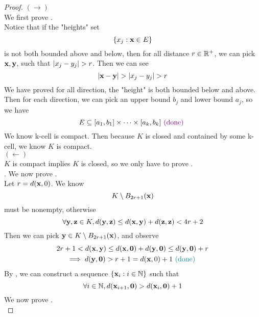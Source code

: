 \documentclass{report}
\begin{document}
\begin{proof}
$(\longrightarrow)$\\

We first prove .\\

Notice that if the "heights" set 
\begin{equation}
\{ x_j:\textbf{x}\in E \}
\end{equation}
is not both bounded above and below, then for all distance $r\in\mathbb{R}^+$, we can pick $\textbf{x},\textbf{y}$, such that $\abso{x_j-y_j}>r$. Then we can see 
\begin{equation}
\abso{\vecta{x}-\vecta{y}}>\abso{x_j-y_j}>r
\end{equation}
We have proved for all direction, the "height" is both bounded below and above.\\

Then for each direction, we can pick an upper bound $b_j$ and lower bound $a_j$, so we have
\begin{equation}
E\subseteq [a_1,b_1]\times \cdots \times [a_k,b_k]\textcolor{violet}{\text{ (done) }}
\end{equation}
We know k-cell is compact. Then because $K$ is closed and contained by some k-cell, we know $K$ is compact.\\

$(\longleftarrow)$\\

$K$ is compact implies $K$ is closed, so we only have to prove .\\

. We now prove  .\\

Let $r=d(\textbf{x},0)$. We know 
\begin{equation}
K\setminus B_{2r+1}(\textbf{x})
\end{equation}
must be nonempty, otherwise 
\begin{equation}
\forall \textbf{y},\textbf{z}\in K, d(\textbf{y},\textbf{z})\leq d(\textbf{x},\textbf{y})+d(\textbf{z},\textbf{z})<4r+2
\end{equation}
Then we can pick $\textbf{y}\in K \setminus B_{2r+1}(\textbf{x})$, and observe
\begin{gather}
2r+1< d(\textbf{x},\textbf{y})\leq d(\textbf{x},\textbf{0})+d(\textbf{y},\textbf{0})\leq d(\textbf{y},\textbf{0})+r\\
\implies d(\textbf{y},\textbf{0})>r+1=d(\textbf{x},0)+1\textcolor{teal}{\text{ (done) }}
\end{gather} 
By  , we can construct a sequence $\{ \textbf{x}_i:i\in\mathbb{N} \}$ such that 
\begin{equation}
\forall i\in\mathbb{N}, d(\textbf{x}_{i+1},\textbf{0})>d(\textbf{x}_{i},\textbf{0})+1
\end{equation}
We now prove .\\


\end{proof}
\end{document}
